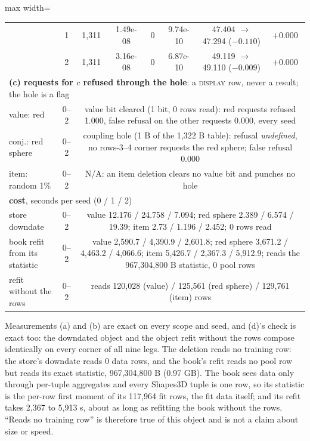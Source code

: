 \documentclass{article} %
\begin{document}
\begin{table}[t]
\begin{adjustbox}{max width=\linewidth}
\begin{tabular}{lccccccc}
 & 1 & 1,311 & 1.49e-08 & 0 & 9.74e-10 & 47.404 $\to$ 47.294 ($-0.110$) & $+0.000$ \\
 & 2 & 1,311 & 3.16e-08 & 0 & 6.87e-10 & 49.119 $\to$ 49.110 ($-0.009$) & $+0.000$ \\
\midrule
\multicolumn{8}{l}{\textbf{(c) requests for $c$ refused through the hole}: a \textsc{display} row, never a result; the hole is a flag} \\
value: red & 0--2 & \multicolumn{6}{p{10.6cm}}{value bit cleared (1 bit, 0 rows read): red requests refused 1.000, false refusal on the other requests 0.000, every seed} \\
conj.: red sphere & 0--2 & \multicolumn{6}{p{10.6cm}}{coupling hole (1 B of the 1,322 B table): refusal \emph{undefined}, no rows-3--4 corner requests the red sphere; false refusal 0.000} \\
item: random 1\% & 0--2 & \multicolumn{6}{p{10.6cm}}{N/A: an item deletion clears no value bit and punches no hole} \\
\midrule
\multicolumn{8}{l}{\textbf{cost}, seconds per seed (0 / 1 / 2)} \\
store downdate & 0--2 & \multicolumn{6}{p{10.6cm}}{value 12.176 / 24.758 / 7.094; red sphere 2.389 / 6.574 / 19.39; item 2.73 / 1.196 / 2.452; 0 rows read} \\
book refit from its statistic & 0--2 & \multicolumn{6}{p{10.6cm}}{value 2,590.7 / 4,390.9 / 2,601.8; red sphere 3,671.2 / 4,463.2 / 4,066.6; item 5,426.7 / 2,367.3 / 5,912.9; reads the 967,304,800 B statistic, 0 pool rows} \\
refit without the rows & 0--2 & \multicolumn{6}{p{10.6cm}}{reads 120,028 (value) / 125,561 (red sphere) / 129,761 (item) rows} \\
\bottomrule
\end{tabular}\end{adjustbox}
\end{table}

\noindent Measurements (a) and (b) are exact on every scope and seed, and (d)'s check is exact too:
the downdated object and the object refit without the rows compose identically on every corner of
all nine legs. The deletion reads no training row: the store's downdate reads 0 data rows, and the %
book's refit reads no pool row but reads its exact statistic, 967,304,800 B (0.97 GB). The book sees %
data only through per-tuple aggregates and every Shapes3D tuple is one row, so its statistic is the
per-row first moment of its 117,964 fit rows, the fit data itself; and its refit takes 2,367 to %
5,913 s, about as long as refitting the book without the rows. ``Reads no training row'' is %
therefore true of this object and is not a claim about size or speed.
\end{document}
